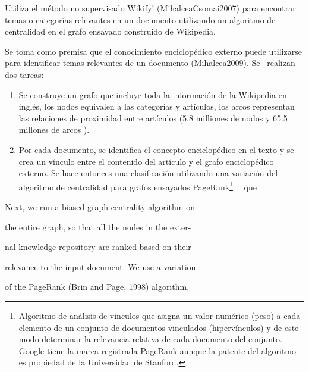 \documentclass[letterpaper]{article}
\newcommand\textstylebibuscitbase[1]{#1}
\newcommand\liststyleLxiii{%
\renewcommand\theenumi{\arabic{enumi}}
\renewcommand\theenumii{\arabic{enumii}}
\renewcommand\theenumiii{\arabic{enumiii}}
\renewcommand\theenumiv{\arabic{enumiv}}
\renewcommand\labelenumi{(\theenumi)}
\renewcommand\labelenumii{\theenumii.}
\renewcommand\labelenumiii{\theenumiii.}
\renewcommand\labelenumiv{\theenumiv.}
}
\begin{document}
\bigskip

{\sffamily
Utiliza el m\'etodo no supervisado Wikify! (MihalceaCsomai2007) para
encontrar temas o categor\'ias relevantes en un documento utilizando un
algoritmo de centralidad en el grafo ensayado construido de Wikipedia.}

{\sffamily
Se toma como premisa que el conocimiento enciclop\'edico externo puede
utilizarse para identificar temas relevantes de un documento
(Mihalcea2009). Se \ realizan dos tareas:}


\bigskip

\liststyleLxiii
\begin{enumerate}
\item {\sffamily
Se construye un grafo que incluye toda la informaci\'on de la Wikipedia
en ingl\'es, los nodos equivalen a las categor\'ias y art\'iculos, los
arcos representan las relaciones de proximidad entre art\'iculos (5.8
milliones de nodos y 65.5 millones de arcos ).}
\item {\sffamily
Por cada documento, se identifica el concepto enciclop\'edico en el
texto y se crea un v\'inculo entre el contenido del art\'iculo y el
grafo enciclop\'edico externo. Se hace entonces una clasificaci\'on
utilizando una variaci\'on del algoritmo de centralidad para grafos
ensayados PageRank\footnote{Algoritmo de an\'alisis de v\'inculos que
asigna un valor num\'erico (peso) a cada elemento de un conjunto de
documentos vinculados (hiperv\'inculos) y de este modo determinar la
relevancia relativa de cada documento del conjunto. Google tiene la
marca registrada {\textquotedbl}PageRank{\textquotedbl} aunque la
patente del algoritmo es propiedad de la Universidad de Stanford. }
\ \ que }
\end{enumerate}

\bigskip

{\sffamily
\textstylebibuscitbase{Next, we run a biased graph centrality algorithm
on }}

{\sffamily
\textstylebibuscitbase{the entire graph, so that all the nodes in the
exter- }}

{\sffamily
\textstylebibuscitbase{nal knowledge repository are ranked based on
their }}

{\sffamily
\textstylebibuscitbase{relevance to the input document. We use a
variation }}

{\sffamily
\textstylebibuscitbase{of the PageRank (Brin and Page, 1998) algorithm,
}}
\end{document}

